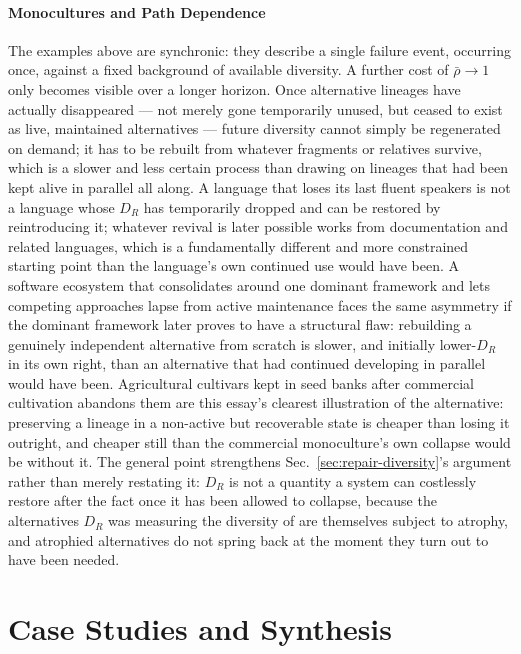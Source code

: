 \documentclass[11pt,a4paper]{article}
\theoremstyle{plain}
\theoremstyle{definition}
\theoremstyle{remark}
\newcommand{\DR}{D_R}
\begin{document}
\subsection{Monocultures and Path Dependence}
\label{subsec:monoculture-path-dependence}

The examples above are synchronic: they describe a single failure event, occurring once, against a fixed background of available diversity. A further cost of $\bar\rho \to 1$ only becomes visible over a longer horizon. Once alternative lineages have actually disappeared — not merely gone temporarily unused, but ceased to exist as live, maintained alternatives — future diversity cannot simply be regenerated on demand; it has to be rebuilt from whatever fragments or relatives survive, which is a slower and less certain process than drawing on lineages that had been kept alive in parallel all along. A language that loses its last fluent speakers is not a language whose $\DR$ has temporarily dropped and can be restored by reintroducing it; whatever revival is later possible works from documentation and related languages, which is a fundamentally different and more constrained starting point than the language's own continued use would have been. A software ecosystem that consolidates around one dominant framework and lets competing approaches lapse from active maintenance faces the same asymmetry if the dominant framework later proves to have a structural flaw: rebuilding a genuinely independent alternative from scratch is slower, and initially lower-$\DR$ in its own right, than an alternative that had continued developing in parallel would have been. Agricultural cultivars kept in seed banks after commercial cultivation abandons them are this essay's clearest illustration of the alternative: preserving a lineage in a non-active but recoverable state is cheaper than losing it outright, and cheaper still than the commercial monoculture's own collapse would be without it. The general point strengthens Sec.~\ref{sec:repair-diversity}'s argument rather than merely restating it: $\DR$ is not a quantity a system can costlessly restore after the fact once it has been allowed to collapse, because the alternatives $\DR$ was measuring the diversity of are themselves subject to atrophy, and atrophied alternatives do not spring back at the moment they turn out to have been needed.

\part{Case Studies and Synthesis}
\end{document}
